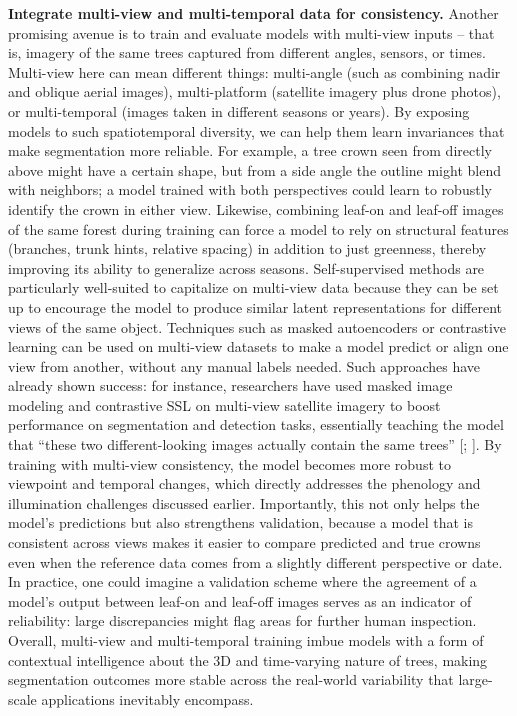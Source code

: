 \documentclass[runningheads]{llncs}
\begin{document}
\textbf{Integrate multi-view and multi-temporal data for consistency.}
Another promising avenue is to train and evaluate models with multi-view
inputs -- that is, imagery of the same trees captured from different
angles, sensors, or times. Multi-view here can mean different things:
multi-angle (such as combining nadir and oblique aerial images),
multi-platform (satellite imagery plus drone photos), or multi-temporal
(images taken in different seasons or years). By exposing models to such
spatiotemporal diversity, we can help them learn invariances that make
segmentation more reliable. For example, a tree crown seen from directly
above might have a certain shape, but from a side angle the outline
might blend with neighbors; a model trained with both perspectives could
learn to robustly identify the crown in either view. Likewise, combining
leaf-on and leaf-off images of the same forest during training can force
a model to rely on structural features (branches, trunk hints, relative
spacing) in addition to just greenness, thereby improving its ability to
generalize across seasons. Self-supervised methods are particularly
well-suited to capitalize on multi-view data because they can be set up
to encourage the model to produce similar latent representations for
different views of the same object. Techniques such as masked
autoencoders or contrastive learning can be used on multi-view datasets
to make a model predict or align one view from another, without any
manual labels needed. Such approaches have already shown success: for
instance, researchers have used masked image modeling and contrastive
SSL on multi-view satellite imagery to boost performance on segmentation
and detection tasks, essentially teaching the model that ``these two
different-looking images actually contain the same trees''
{[}\cite{mukkavilli2023prithvi}; \cite{fibaek2024phileo}{]}. By training
with multi-view consistency, the model becomes more robust to viewpoint
and temporal changes, which directly addresses the phenology and
illumination challenges discussed earlier. Importantly, this not only
helps the model's predictions but also strengthens validation, because a
model that is consistent across views makes it easier to compare
predicted and true crowns even when the reference data comes from a
slightly different perspective or date. In practice, one could imagine a
validation scheme where the agreement of a model's output between
leaf-on and leaf-off images serves as an indicator of reliability: large
discrepancies might flag areas for further human inspection. Overall,
multi-view and multi-temporal training imbue models with a form of
contextual intelligence about the 3D and time-varying nature of trees,
making segmentation outcomes more stable across the real-world
variability that large-scale applications inevitably encompass.
\end{document}
